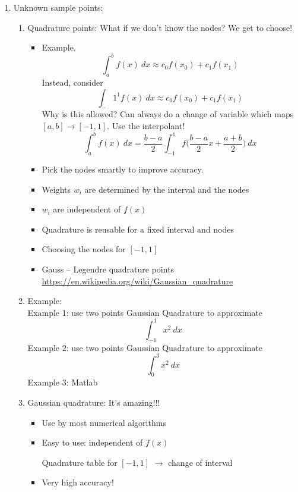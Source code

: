 \documentclass{article}
\theoremstyle{remark}
\begin{document}
\begin{enumerate}
\item Unknown sample points:
\begin{enumerate}
\item Quadrature points: What if we don't know the nodes? We get to choose! 
\begin{itemize}
\item Example.
\[
\int_a^b f(x) ~dx \approx c_0 f(x_0) + c_1 f(x_1)
\]
Instead, consider
\[
\int_-1^1 f(x) ~dx \approx c_0 f(x_0) + c_1 f(x_1)
\]
Why is this allowed? Can always do a change of variable which maps $[a,b] \rightarrow [-1,1]$. Use the interpolant! 
\[
\int_a^bf(x) ~dx = \frac{b-a}{2}\int_{-1}^1 f\Big(\frac{b-a}{2}x+\frac{a+b}{2}\Big)~dx
\]
\item Pick the nodes smartly to improve accuracy.
\item Weights $w_i$ are determined by the interval and the nodes
\item $w_i$ are independent of $f(x)$
\item Quadrature is reusable for a fixed interval and nodes
\item Choosing the nodes for $[-1,1]$
\item Gauss -- Legendre quadrature points\\[0.1in]
\url{https://en.wikipedia.org/wiki/Gaussian_quadrature}
\end{itemize}

\item Example: \\
Example 1: use two points Gaussian Quadrature to approximate
$$
\int_{-1}^1 x^2~dx
$$
Example 2: use two points Gaussian Quadrature to approximate
$$
\int_{0}^3 x^2~dx
$$
Example 3: Matlab 

\item Gaussian quadrature: It's amazing!!!
\begin{itemize}
\item Use by most numerical algorithms
\item Easy to use: independent of $f(x)$
\begin{center}
Quadrature table for $[-1,1]$ $\rightarrow$ change of interval
\end{center} 
\item Very high accuracy!
\end{itemize}
\end{enumerate}


\end{enumerate}
\end{document}
